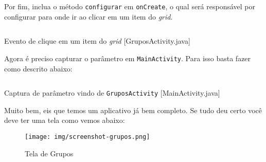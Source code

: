 Por fim, inclua o método \texttt{configurar} em \texttt{onCreate}, o
qual será responsável por configurar para onde ir ao clicar em um item
do \emph{grid}.

\begin{listing}[H]
  \inputminted[linenos=true,frame=bottomline,tabsize=3]{ java }{ source/GruposActivity-4.java }
  \caption{Evento de clique em um item do \textit{grid} [GruposActivity.java]}
\end{listing}

Agora é preciso capturar o parâmetro em \texttt{MainActivity}. Para isso
basta fazer como descrito abaixo:

\begin{listing}[H]
  \inputminted[linenos=true,frame=bottomline,tabsize=3]{ java }{ source/MainActivity-14.java }
  \caption{Captura de parâmetro vindo de \texttt{GruposActivity} [MainActivity.java]}
\end{listing}

Muito bem, eis que temos um aplicativo já bem completo. Se tudo deu
certo você deve ter uma tela como vemos abaixo:

\begin{figure}[h]
    \centering
    \texttt{[image: img/screenshot-grupos.png]}
    \caption{Tela de Grupos}
\end{figure}
